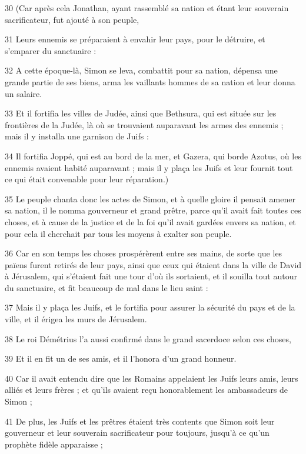 \par 30 (Car après cela Jonathan, ayant rassemblé sa nation et étant leur souverain sacrificateur, fut ajouté à son peuple,
\par 31 Leurs ennemis se préparaient à envahir leur pays, pour le détruire, et s'emparer du sanctuaire :
\par 32 A cette époque-là, Simon se leva, combattit pour sa nation, dépensa une grande partie de ses biens, arma les vaillants hommes de sa nation et leur donna un salaire.
\par 33 Et il fortifia les villes de Judée, ainsi que Bethsura, qui est située sur les frontières de la Judée, là où se trouvaient auparavant les armes des ennemis ; mais il y installa une garnison de Juifs :
\par 34 Il fortifia Joppé, qui est au bord de la mer, et Gazera, qui borde Azotus, où les ennemis avaient habité auparavant ; mais il y plaça les Juifs et leur fournit tout ce qui était convenable pour leur réparation.)
\par 35 Le peuple chanta donc les actes de Simon, et à quelle gloire il pensait amener sa nation, il le nomma gouverneur et grand prêtre, parce qu'il avait fait toutes ces choses, et à cause de la justice et de la foi qu'il avait gardées envers sa nation, et pour cela il cherchait par tous les moyens à exalter son peuple.
\par 36 Car en son temps les choses prospérèrent entre ses mains, de sorte que les païens furent retirés de leur pays, ainsi que ceux qui étaient dans la ville de David à Jérusalem, qui s'étaient fait une tour d'où ils sortaient, et il souilla tout autour du sanctuaire, et fit beaucoup de mal dans le lieu saint :
\par 37 Mais il y plaça les Juifs, et le fortifia pour assurer la sécurité du pays et de la ville, et il érigea les murs de Jérusalem.
\par 38 Le roi Démétrius l'a aussi confirmé dans le grand sacerdoce selon ces choses,
\par 39 Et il en fit un de ses amis, et il l'honora d'un grand honneur.
\par 40 Car il avait entendu dire que les Romains appelaient les Juifs leurs amis, leurs alliés et leurs frères ; et qu'ils avaient reçu honorablement les ambassadeurs de Simon ;
\par 41 De plus, les Juifs et les prêtres étaient très contents que Simon soit leur gouverneur et leur souverain sacrificateur pour toujours, jusqu'à ce qu'un prophète fidèle apparaisse ;
